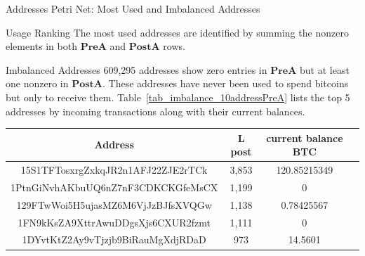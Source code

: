 \documentclass{beamer}
\begin{document}
\begin{frame}{Addresses Petri Net: Most Used and Imbalanced Addresses}
    \footnotesize
    \begin{block}{Usage Ranking}
        The most used addresses are identified by summing the nonzero elements in both $\mathbf{PreA}$ and $\mathbf{PostA}$ rows.
    \end{block}

    \begin{block}{Imbalanced Addresses}
        609,295 addresses show zero entries in $\mathbf{PreA}$ but at least one nonzero in $\mathbf{PostA}$. These addresses have never been used to spend bitcoins but only to receive them. Table~\ref{tab_imbalance_10addressPreA} lists the top 5 addresses by incoming transactions along with their current balances.
    \end{block}

    \begin{center}
        \begin{tabular}{cccc} %
            \hline
            Address                            & L post & current balance BTC \\ \hline
            15S1TFTosxrgZxkqJR2n1AFJ22ZJE2rTCk & 3,853  & 120.85215349        \\
            1PtnGiNvhAKbuUQ6nZ7nF3CDKCKGfeMsCX & 1,199  & 0                   \\
            129FTwWoi5H5ujasMZ6M6VjJzBJfsXVQGw & 1,138  & 0.78425567          \\
            1FN9kKsZA9XttrAwuDDgsXjs6CXUR2fzmt & 1,111  & 0                   \\
            1DYvtKtZ2Ay9vTjzjb9BiRauMgXdjRDaD  & 973    & 14.5601             \\
        \end{tabular}
        \vspace{.2cm}
    \end{center}
    \label{tab_imbalance_10addressPreA}

\end{frame}
\end{document}
